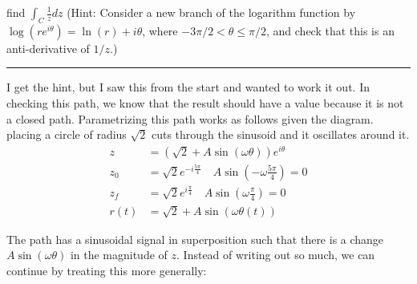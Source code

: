 \documentclass{article}
\let\oldsin\sin
\renewcommand{\sin}[1]{\oldsin\left(#1\right)}
\begin{document}

find $\int_C \frac{1}{z}dz$ (Hint: Consider a new branch of the logarithm function by $\log{(re^{i\theta})} = \ln{(r)} + i\theta$, where $-3\pi/2 < \theta \leq \pi/2$, and check that this is an anti-derivative of $1/z$.)
\vspace{0.5cm}
\hrule %
\vspace{0.5cm}
I get the hint, but I saw this from the start and wanted to work it out. In checking this path, we know that the result should have a value because it is not a closed path. Parametrizing this path works as follows given the diagram. placing a circle of radius $\sqrt{2}$ cuts through the sinusoid and it oscillates around it.  
\begin{align*}
  z &= (\sqrt{2}+A\sin{\omega\theta})e^{i\theta} \\
  z_0 &= \sqrt{2}e^{-i\frac{5\pi}{4}} \quad A\sin{-\omega\frac{5\pi}{4}} = 0 \\
  z_f &= \sqrt{2}e^{i\frac{\pi}{4}}  \quad A\sin{\omega\frac{\pi}{4}} = 0\\
  r(t) &= \sqrt{2}+A\sin{\omega\theta(t)}
\end{align*}

The path has a sinusoidal signal in superposition such that there is a change $A\sin{\omega\theta}$ in the magnitude of $z$. Instead of writing out so much, we can continue by treating this more generally:
\end{document}
